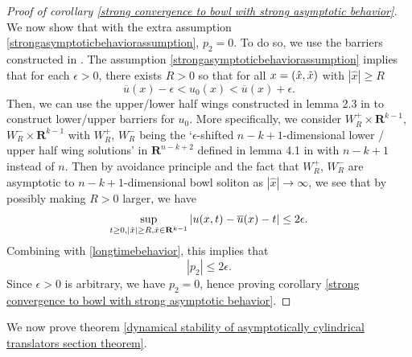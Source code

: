 \documentclass[pdflatex,sn-mathphys-num]{sn-jnl}%
\begin{document}
\begin{proof}[Proof of corollary \ref{strong convergence to bowl with strong asymptotic behavior}]
We now show that with the extra assumption \eqref{strongasymptoticbehaviorassumption}, $p_2 = 0$. To do so, we use the barriers constructed in \cite{bowlstability}.
The assumption \eqref{strongasymptoticbehaviorassumption} implies that for each $\epsilon > 0$, there exists $R > 0$ so that for all $x = (\hat{x}, \Tilde{x})$ with $|\hat{x}| \geq R$
\begin{equation}
    \overline{u}(x) - \epsilon < u_0(x) < \overline{u}(x) + \epsilon.
\end{equation}
Then, we can use the upper/lower half wings constructed in lemma 2.3 in \cite{bowlstability} to construct lower/upper barriers for $u_0$. More specifically, we consider $W^{+}_R\times \mathbf{R}^{k-1}$, $W^{-}_R\times \mathbf{R}^{k-1}$ with $W^{+}_{R}$, $W^-_{R}$ being the `$\epsilon$-shifted $n-k+1$-dimensional lower / upper half wing solutions' in $\mathbf{R}^{n-k+2}$ defined in lemma 4.1 in \cite{bowlstability} with $n-k+1$ instead of $n$. Then by avoidance principle and the fact that $W^{+}_R$, $W^{-}_R$ are asymptotic to $n-k+1$-dimensional bowl soliton as $|\hat{x}| \to \infty$, we see that by possibly making $R > 0$ larger, we have
\begin{equation}\label{asmpytoticclosenessfarried}
    \sup_{t \geq 0, |\hat{x}| \geq R, \Tilde{x}\in \mathbf{R}^{k-1}} |u(x,t) - \overline{u}(x) - t| \leq 2\epsilon.
\end{equation}
Combining with \eqref{longtimebehavior}, this implies that
\begin{equation}
    |p_2| \leq 2\epsilon.
\end{equation}
Since $\epsilon > 0$ is arbitrary, we have $p_2 = 0$, hence proving corollary \ref{strong convergence to bowl with strong asymptotic behavior}.
\end{proof}
We now prove theorem \ref{dynamical stability of asymptotically cylindrical translators section theorem}.
\end{document}
